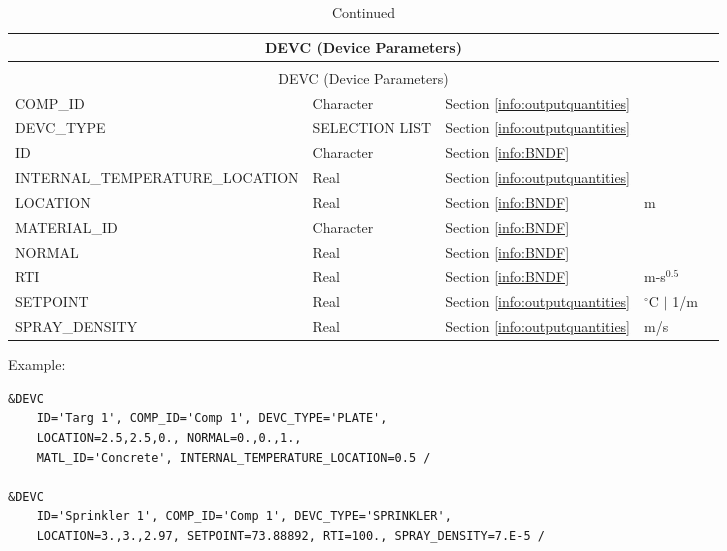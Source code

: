 \begin{longtable}{@{\extracolsep{\fill}}|l|l|l|l|l|}
\caption[Boundary file parameters ({\ct DEVC} namelist group)]{For more information see Section~\ref{info:BNDF}.}
\label{tbl:DEVC} \\
\hline
\multicolumn{5}{|c|}{{\ct DEVC} (Device Parameters)} \\
\hline \hline
\endfirsthead
\caption[]{Continued} \\
\hline
\multicolumn{5}{|c|}{{\ct DEVC} (Device Parameters)} \\
\hline \hline
\endhead
{\ct COMP\_ID}            & Character   & Section \ref{info:outputquantities}     &                   &                 \\ \hline
{\ct DEVC\_TYPE}      & {\ct SELECTION LIST}   & Section \ref{info:outputquantities}     &                   &                 \\ \hline
{\ct ID}      		      & Character   & Section \ref{info:BNDF}                 &                   &                 \\ \hline
{\ct INTERNAL\_TEMPERATURE\_LOCATION}     & Real        & Section \ref{info:outputquantities}     &                   &                 \\ \hline
{\ct LOCATION}       & Real        & Section \ref{info:BNDF}                 & m                 &                 \\ \hline
{\ct MATERIAL\_ID}            & Character   & Section \ref{info:BNDF}                 &                   &                 \\ \hline
{\ct NORMAL}         & Real        & Section \ref{info:BNDF}                 &                   &                 \\ \hline
{\ct RTI}                 & Real        & Section \ref{info:BNDF}                 & m-s$^{0.5}$       &                 \\ \hline
{\ct SETPOINT}             & Real        & Section \ref{info:outputquantities}     & $^\circ$C $\mid$ 1/m  &                 \\ \hline
{\ct SPRAY\_DENSITY}      & Real        & Section \ref{info:outputquantities}     & m/s               &                 \\ \hline
\end{longtable}

\noindent Example:
\begin{lstlisting}
&DEVC 
	ID='Targ 1', COMP_ID='Comp 1', DEVC_TYPE='PLATE', 
	LOCATION=2.5,2.5,0., NORMAL=0.,0.,1.,
	MATL_ID='Concrete', INTERNAL_TEMPERATURE_LOCATION=0.5 /

&DEVC 
	ID='Sprinkler 1', COMP_ID='Comp 1', DEVC_TYPE='SPRINKLER',
	LOCATION=3.,3.,2.97, SETPOINT=73.88892, RTI=100., SPRAY_DENSITY=7.E-5 /
\end{lstlisting}

